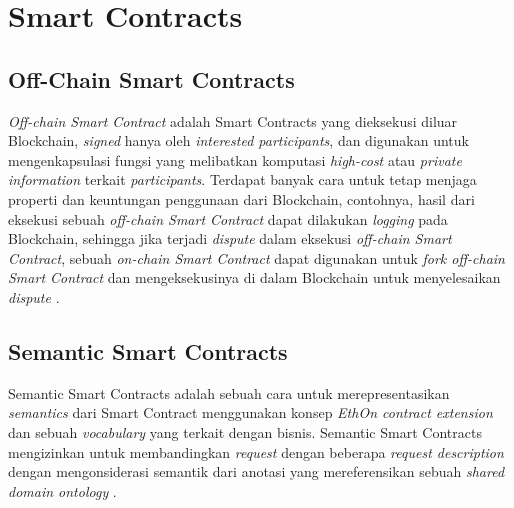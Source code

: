\section{Smart Contracts}
\label{sec:smart-contract}









\subsection{Off-Chain Smart Contracts}
\label{subsec:off-chain-smart-contracts}

\textit{Off-chain Smart Contract} adalah Smart Contracts yang dieksekusi diluar Blockchain, \textit{signed} hanya oleh \textit{interested participants}, dan digunakan untuk mengenkapsulasi fungsi yang melibatkan komputasi \textit{high-cost} atau \textit{private information} terkait \textit{participants}. Terdapat banyak cara untuk tetap menjaga properti dan keuntungan penggunaan dari Blockchain, contohnya, hasil dari eksekusi sebuah \textit{off-chain Smart Contract} dapat dilakukan \textit{logging} pada Blockchain, sehingga jika terjadi \textit{dispute} dalam eksekusi \textit{off-chain Smart Contract}, sebuah \textit{on-chain Smart Contract} dapat digunakan untuk \textit{fork off-chain Smart Contract} dan mengeksekusinya di dalam Blockchain untuk menyelesaikan \textit{dispute} \parencite{zou2019smart}.

\subsection{Semantic Smart Contracts}
\label{subsec:semantic-smart-contracts}
Semantic Smart Contracts adalah sebuah cara untuk merepresentasikan \textit{semantics} dari Smart Contract menggunakan konsep \textit{EthOn contract extension} dan sebuah \textit{vocabulary} yang terkait dengan bisnis. Semantic Smart Contracts mengizinkan untuk membandingkan \textit{request} dengan beberapa \textit{request description} dengan mengonsiderasi semantik dari anotasi yang mereferensikan sebuah \textit{shared domain ontology} \parencite{baqa2019semantic}.
